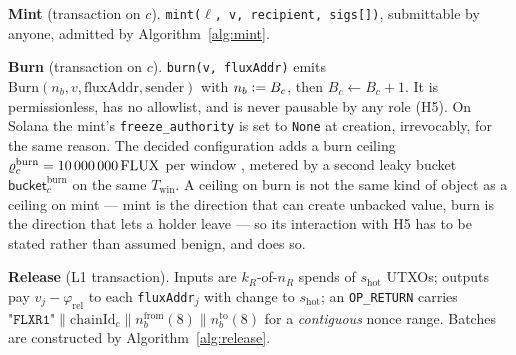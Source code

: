 \begin{construction}
\smallskip
\noindent\textbf{Mint} (transaction on $c$). \texttt{mint($\ell$, v, recipient, sigs[])}, submittable
by anyone, admitted by Algorithm~\ref{alg:mint}.

\smallskip
\noindent\textbf{Burn} (transaction on $c$). \texttt{burn(v, flux\allowbreak{}Addr)} emits
$\mathrm{Burn}(n_b, v, \mathrm{fluxAddr}, \mathrm{sender})$ with $n_b \vcentcolon= B_c$, then
$B_c \leftarrow B_c + 1$. It is permissionless, has no allowlist, and is never pausable by any role
(H5). On Solana the mint's \texttt{freeze\_authority} is set to \texttt{None} at creation,
irrevocably, for the same reason. The decided configuration adds a burn ceiling
$\varrho^{\mathrm{burn}}_c = \num{10000000}\,\mathrm{FLUX}$ per window
, metered by a second leaky bucket
$\mathsf{bucket}^{\mathrm{burn}}_c$ on the same $T_{\mathrm{win}}$. A ceiling on burn is not the same
kind of object as a ceiling on mint --- mint is the direction that can create unbacked value, burn is
the direction that lets a holder leave --- so its interaction with H5 has to be stated rather than
assumed benign, and  does so.

\smallskip
\noindent\textbf{Release} (L1 transaction). Inputs are $k_R$-of-$n_R$ spends of $s_{\mathrm{hot}}$
UTXOs; outputs pay $v_j - \varphi_{\mathrm{rel}}$ to each \texttt{fluxAddr}$_j$ with change to
$s_{\mathrm{hot}}$; an \texttt{OP\_RETURN} carries
$\texttt{"FLXR1"} \| \mathrm{chainId}_c \| n_b^{\mathrm{from}}(8) \| n_b^{\mathrm{to}}(8)$ for a
\emph{contiguous} nonce range. Batches are constructed by Algorithm~\ref{alg:release}.
\end{construction}

